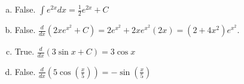 \documentclass[11pt]{exam}
\begin{document}
\begin{questions}
    \begin{solution}
      \begin{enumerate}[(a)]
      \item False. \(\int e^{2x} dx = \frac{1}{2} e^{2x} + C\)
      \item False. \(\frac{d}{dx} \left( 2x e^{x^2} + C \right) = 2
        e^{x^2} + 2x e^{x^2} (2x) = (2+4x^2) e^{x^2}\).
      \item True. \(\frac{d}{dx}(3 \sin x + C) = 3 \cos x\)
      \item False. \(\frac{d}{dx} \left( 5 \cos\left( \frac{x}{5}
          \right) \right) = -\sin\left( \frac{x}{5} \right)\)
      \end{enumerate}
    \end{solution}
\end{questions}
\end{document}
